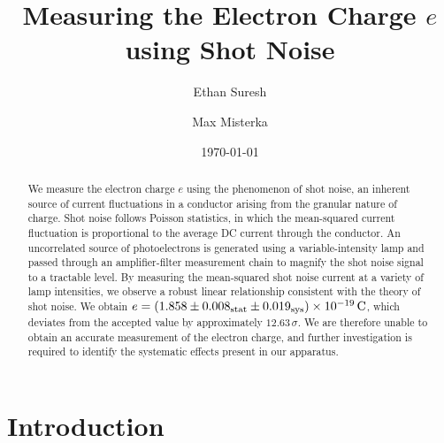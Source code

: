 \documentclass[aps,twocolumn,secnumarabic,balancelastpage,amsmath,amssymb,nofootinbib,floatfix]{revtex4-1}
\begin{document}
\title{Measuring the Electron Charge $e$ using Shot Noise}
\author{Ethan Suresh}
\author{Max Misterka}

\date{\today}


\begin{abstract}
We measure the electron charge $e$ using the phenomenon of shot noise, an inherent source of current fluctuations in a conductor arising from the granular nature of charge. Shot noise follows Poisson statistics, in which the mean-squared current fluctuation is proportional to the average DC current through the conductor. An uncorrelated source of photoelectrons is generated using a variable-intensity lamp and passed through an amplifier-filter measurement chain to magnify the shot noise signal to a tractable level. By measuring the mean-squared shot noise current at a variety of lamp intensities, we observe a robust linear relationship consistent with the theory of shot noise. We obtain $e = \left( 1.858 \pm 0.008_{\rm stat} \pm 0.019_{\rm sys} \right) \times 10^{{-19}}\,\text{C}$, which deviates from the accepted value by approximately $12.63\,\sigma$. We are therefore unable to obtain an accurate measurement of the electron charge, and further investigation is required to identify the systematic effects present in our apparatus.
    
\end{abstract}

\maketitle




\section{Introduction}
\end{document}
